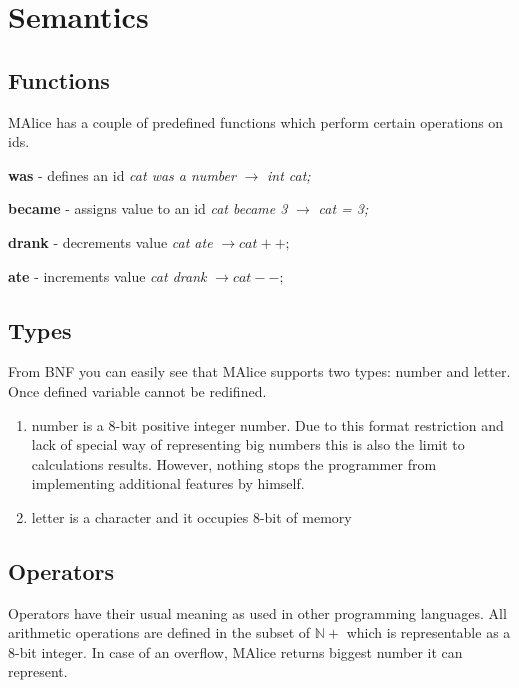 \documentclass[a4wide, 11pt]{article}
\begin{document}
\section{Semantics}

\subsection{Functions}

MAlice has a couple of predefined functions which perform certain operations on ids.

\textbf{was} - defines an id
\textit{cat was a number} $\to$ \emph{int cat;}

\textbf{became} - assigns value to an id
\textit{cat became 3} $\to$ \emph{cat = 3;}


\textbf{drank} - decrements value
\textit{cat ate} $\to cat++;$


\textbf{ate} - increments value
\textit{cat drank} $\to cat--;$
\subsection{Types}

From BNF you can easily see that MAlice supports two types: number and letter. Once defined variable cannot be redifined.

\begin{enumerate}
     \item
     number is a 8-bit positive integer number. Due to this format restriction and lack of special way of representing big numbers this is also the limit to calculations results. However, nothing stops the programmer from implementing additional features by himself.  

     \item
     letter is a character and it occupies 8-bit of memory

\end{enumerate}

\subsection{Operators}

Operators have their usual meaning as used in other programming languages. All arithmetic operations are defined in the subset of $\mathbb{N+}$ which is representable as a 8-bit integer. In case of an overflow, MAlice returns biggest number it can represent.
\end{document}
